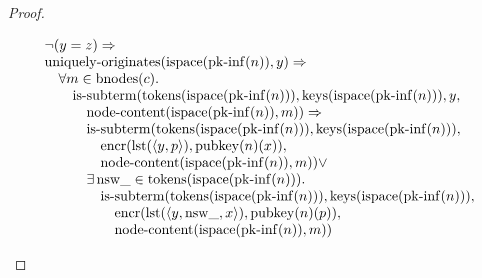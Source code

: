 \documentclass[11pt]{article}
\theoremstyle{plain}
\begin{document}
\begin{proof}
\begin{itemize}[leftmargin=2.8em, itemsep=4pt, parsep=1pt]
\begin{itemize}[leftmargin=2.8em, itemsep=4pt, parsep=1pt]
\begin{equation*}
\begin{array}{@{}l@{}}
\begin{array}{@{}l@{}} \neg (y = z) \Rightarrow  \\ \operatorname{uniquely\text{-}originates}(\operatorname{ispace}(\operatorname{pk\text{-}inf}(n)), y) \Rightarrow  \\ \quad \forall m \in \operatorname{bnodes}(c). \\ \quad \quad \operatorname{is\text{-}subterm}(\operatorname{tokens}(\operatorname{ispace}(\operatorname{pk\text{-}inf}(n))), \operatorname{keys}(\operatorname{ispace}(\operatorname{pk\text{-}inf}(n))), y, \\ \quad \quad \quad \operatorname{node\text{-}content}(\operatorname{ispace}(\operatorname{pk\text{-}inf}(n)), m)) \Rightarrow \\ \quad \quad \quad \operatorname{is\text{-}subterm}(\operatorname{tokens}(\operatorname{ispace}(\operatorname{pk\text{-}inf}(n))), \operatorname{keys}(\operatorname{ispace}(\operatorname{pk\text{-}inf}(n))), \\ \quad \quad \quad \quad \operatorname{encr}(\operatorname{lst}(\langle y, p \rangle), \operatorname{pubkey}(n)(x)), \\ \quad \quad \quad \quad \operatorname{node\text{-}content}(\operatorname{ispace}(\operatorname{pk\text{-}inf}(n)), m)) \vee \\ \quad \quad \quad \exists \operatorname{nsw\_} \in \operatorname{tokens}(\operatorname{ispace}(\operatorname{pk\text{-}inf}(n))). \\ \quad \quad \quad \quad \operatorname{is\text{-}subterm}(\operatorname{tokens}(\operatorname{ispace}(\operatorname{pk\text{-}inf}(n))), \operatorname{keys}(\operatorname{ispace}(\operatorname{pk\text{-}inf}(n))), \\ \quad \quad \quad \quad \quad \operatorname{encr}(\operatorname{lst}(\langle y, \operatorname{nsw\_}, x \rangle), \operatorname{pubkey}(n)(p)), \\ \quad \quad \quad \quad \quad \operatorname{node\text{-}content}(\operatorname{ispace}(\operatorname{pk\text{-}inf}(n)), m)) \end{array} \\

\end{array}
\end{equation*}
\end{itemize}
\end{itemize}
\end{proof}
\end{document}
